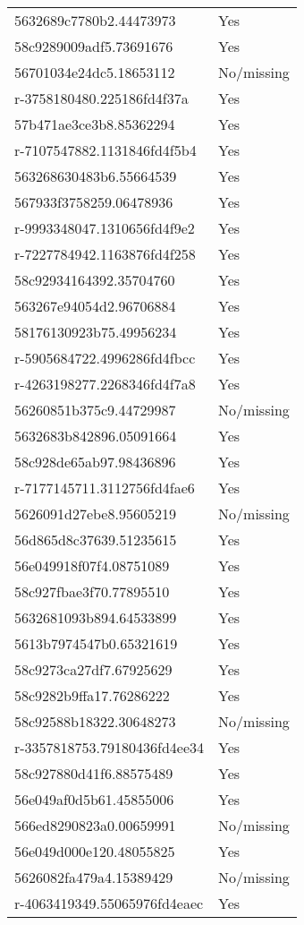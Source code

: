 \begin{tabular}{ll}
5632689c7780b2.44473973 & Yes \\
58c9289009adf5.73691676 & Yes \\
56701034e24dc5.18653112 & No/missing \\
r-3758180480.225186fd4f37a & Yes \\
57b471ae3ce3b8.85362294 & Yes \\
r-7107547882.1131846fd4f5b4 & Yes \\
563268630483b6.55664539 & Yes \\
567933f3758259.06478936 & Yes \\
r-9993348047.1310656fd4f9e2 & Yes \\
r-7227784942.1163876fd4f258 & Yes \\
58c92934164392.35704760 & Yes \\
563267e94054d2.96706884 & Yes \\
58176130923b75.49956234 & Yes \\
r-5905684722.4996286fd4fbcc & Yes \\
r-4263198277.2268346fd4f7a8 & Yes \\
56260851b375c9.44729987 & No/missing \\
5632683b842896.05091664 & Yes \\
58c928de65ab97.98436896 & Yes \\
r-7177145711.3112756fd4fae6 & Yes \\
5626091d27ebe8.95605219 & No/missing \\
56d865d8c37639.51235615 & Yes \\
56e049918f07f4.08751089 & Yes \\
58c927fbae3f70.77895510 & Yes \\
5632681093b894.64533899 & Yes \\
5613b7974547b0.65321619 & Yes \\
58c9273ca27df7.67925629 & Yes \\
58c9282b9ffa17.76286222 & Yes \\
58c92588b18322.30648273 & No/missing \\
r-3357818753.79180436fd4ee34 & Yes \\
58c927880d41f6.88575489 & Yes \\
56e049af0d5b61.45855006 & Yes \\
566ed8290823a0.00659991 & No/missing \\
56e049d000e120.48055825 & Yes \\
5626082fa479a4.15389429 & No/missing \\
r-4063419349.55065976fd4eaec & Yes \\

\end{tabular}
